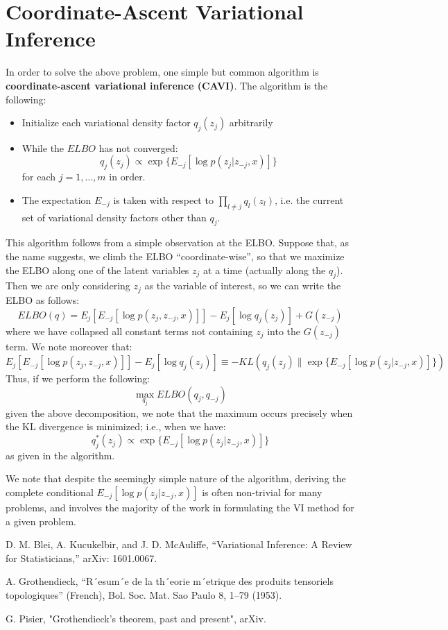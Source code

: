 \documentclass[psamsfonts]{amsart}
\theoremstyle{definition}
\theoremstyle{remark}
\numberwithin{equation}{section}
\begin{document}
\section{Coordinate-Ascent Variational Inference}

In order to solve the above problem, one simple but common algorithm is {\bf coordinate-ascent variational inference (CAVI)}. The algorithm is the following:

\begin{itemize}
\item Initialize each variational density factor $q_j(z_j)$ arbitrarily
\item While the $ELBO$ has not converged:
$$q_j(z_j) \propto \exp \{ E_{-j}[\log p(z_j|z_{-j},x)] \}$$
for each $j = 1, \dots, m$ in order.
\item The expectation $E_{-j}$ is taken with respect to $\prod_{l\neq j} q_l(z_l)$, i.e. the current set of variational density factors other than $q_j$.
\end{itemize}

This algorithm follows from a simple observation at the ELBO. Suppose that, as the name suggests, we climb the ELBO ``coordinate-wise'', so that we maximize the ELBO along one of the latent variables $z_j$ at a time (actually along the $q_j$). Then we are only considering $z_j$ as the variable of interest, so we can write the ELBO as follows:
$$ELBO(q) = E_j[E_{-j}[\log p(z_j, z_{-j},x)]] - E_j[\log q_j(z_j)] + G(z_{-j})$$
where we have collapsed all constant terms not containing $z_j$ into the $G(z_{-j})$ term. We note moreover that:
$$E_j[E_{-j}[\log p(z_j, z_{-j},x)]] - E_j[\log q_j(z_j)] \equiv -KL(q_j(z_j) \| \exp \{ E_{-j}[\log p(z_j|z_{-j},x)] \})$$
Thus, if we perform the following:
$$\max_{q_j} ELBO(q_j, q_{-j})$$
given the above decomposition, we note that the maximum occurs precisely when the KL divergence is minimized; i.e., when we have:
$$q_j^*(z_j) \propto \exp \{ E_{-j}[\log p(z_j|z_{-j},x)] \}$$
as given in the algorithm.

We note that despite the seemingly simple nature of the algorithm, deriving the complete conditional $E_{-j}[\log p(z_j|z_{-j},x)]$ is often non-trivial for many problems, and involves the majority of the work in formulating the VI method for a given problem.

\begin{thebibliography}{9}

D. M. Blei, A. Kucukelbir, and J. D. McAuliffe, ``Variational Inference: A Review for Statisticians,'' arXiv: 1601.0067.

A. Grothendieck, “R´esum´e de la th´eorie m´etrique des produits tensoriels topologiques” (French), Bol. Soc.
Mat. Sao Paulo 8, 1–79 (1953).

G. Pisier, "Grothendieck's theorem, past and present", arXiv.

\end{thebibliography}
\end{document}
